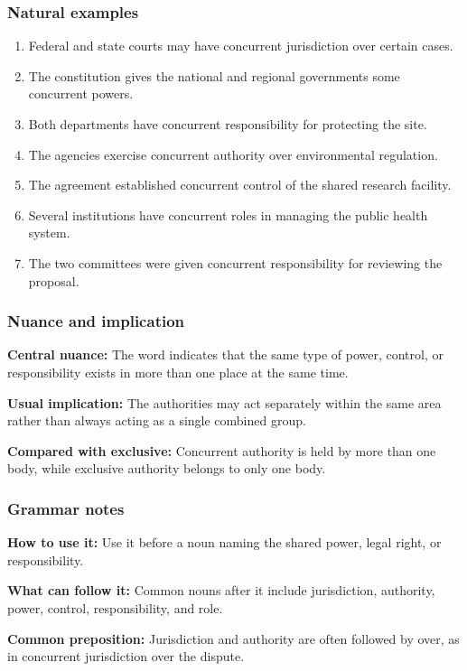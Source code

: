\documentclass[11pt]{article}
\begin{document}
\subsubsection{Natural examples}
\begin{enumerate}
  \item Federal and state courts may have concurrent jurisdiction over certain cases.
  \item The constitution gives the national and regional governments some concurrent powers.
  \item Both departments have concurrent responsibility for protecting the site.
  \item The agencies exercise concurrent authority over environmental regulation.
  \item The agreement established concurrent control of the shared research facility.
  \item Several institutions have concurrent roles in managing the public health system.
  \item The two committees were given concurrent responsibility for reviewing the proposal.
\end{enumerate}

\subsubsection{Nuance and implication}
\textbf{Central nuance:} The word indicates that the same type of power, control, or responsibility exists in more than one place at the same time.

\textbf{Usual implication:} The authorities may act separately within the same area rather than always acting as a single combined group.

\textbf{Compared with exclusive:} Concurrent authority is held by more than one body, while exclusive authority belongs to only one body.

\subsubsection{Grammar notes}
\textbf{How to use it:} Use it before a noun naming the shared power, legal right, or responsibility.

\textbf{What can follow it:} Common nouns after it include jurisdiction, authority, power, control, responsibility, and role.

\textbf{Common preposition:} Jurisdiction and authority are often followed by over, as in concurrent jurisdiction over the dispute.
\end{document}
